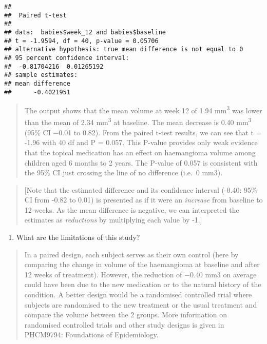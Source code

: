 \documentclass[
]{memoir}
\providecommand{\tightlist}{%
  \setlength{\itemsep}{0pt}\setlength{\parskip}{0pt}}
\begin{document}
\begin{verbatim}
## 
##  Paired t-test
## 
## data:  babies$week_12 and babies$baseline
## t = -1.9594, df = 40, p-value = 0.05706
## alternative hypothesis: true mean difference is not equal to 0
## 95 percent confidence interval:
##  -0.81704216  0.01265192
## sample estimates:
## mean difference 
##      -0.4021951
\end{verbatim}

\begin{quote}
The output shows that the mean volume at week 12 of 1.94 mm\textsuperscript{3} was lower than the mean of 2.34 mm\textsuperscript{3} at baseline. The mean decrease is 0.40 mm\textsuperscript{3} (95\% CI −0.01 to 0.82). From the paired t-test results, we can see that t = -1.96 with 40 df and P = 0.057. This P-value provides only weak evidence that the topical medication has an effect on haemangioma volume among children aged 6 months to 2 years. The P-value of 0.057 is consistent with the 95\% CI just crossing the line of no difference (i.e.~0 mm3).
\end{quote}

\begin{quote}
{[}Note that the estimated difference and its confidence interval (-0.40: 95\% CI from -0.82 to 0.01) is presented as if it were an \emph{increase} from baseline to 12-weeks. As the mean difference is negative, we can interpreted the estimates as \emph{reductions} by multiplying each value by -1.{]}
\end{quote}

\begin{enumerate}
\def\labelenumi{\alph{enumi})}
\setcounter{enumi}{2}
\tightlist
\item
  What are the limitations of this study?
\end{enumerate}

\begin{quote}
In a paired design, each subject serves as their own control (here by comparing the change in volume of the haemangioma at baseline and after 12 weeks of treatment). However, the reduction of −0.40 mm3 on average could have been due to the new medication or to the natural history of the condition. A better design would be a randomised controlled trial where subjects are randomised to the new treatment or the usual treatment and compare the volume between the 2 groups. More information on randomised controlled trials and other study designs is given in PHCM9794: Foundations of Epidemiology.
\end{quote}
\end{document}
